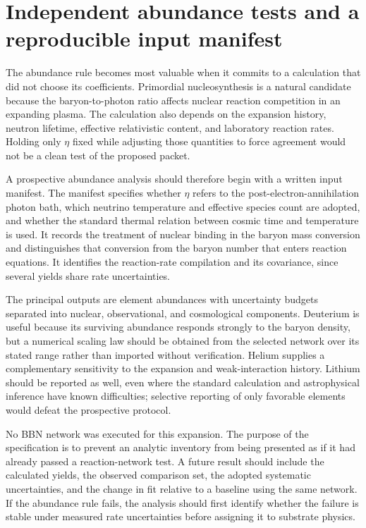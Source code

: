 \section{Independent abundance tests and a reproducible input manifest}
The abundance rule becomes most valuable when it commits to a calculation that did not choose its coefficients. Primordial nucleosynthesis is a natural candidate because the baryon-to-photon ratio affects nuclear reaction competition in an expanding plasma. The calculation also depends on the expansion history, neutron lifetime, effective relativistic content, and laboratory reaction rates. Holding only $\eta$ fixed while adjusting those quantities to force agreement would not be a clean test of the proposed packet.

A prospective abundance analysis should therefore begin with a written input manifest. The manifest specifies whether $\eta$ refers to the post-electron-annihilation photon bath, which neutrino temperature and effective species count are adopted, and whether the standard thermal relation between cosmic time and temperature is used. It records the treatment of nuclear binding in the baryon mass conversion and distinguishes that conversion from the baryon number that enters reaction equations. It identifies the reaction-rate compilation and its covariance, since several yields share rate uncertainties.

The principal outputs are element abundances with uncertainty budgets separated into nuclear, observational, and cosmological components. Deuterium is useful because its surviving abundance responds strongly to the baryon density, but a numerical scaling law should be obtained from the selected network over its stated range rather than imported without verification. Helium supplies a complementary sensitivity to the expansion and weak-interaction history. Lithium should be reported as well, even where the standard calculation and astrophysical inference have known difficulties; selective reporting of only favorable elements would defeat the prospective protocol.

No BBN network was executed for this expansion. The purpose of the specification is to prevent an analytic inventory from being presented as if it had already passed a reaction-network test. A future result should include the calculated yields, the observed comparison set, the adopted systematic uncertainties, and the change in fit relative to a baseline using the same network. If the abundance rule fails, the analysis should first identify whether the failure is stable under measured rate uncertainties before assigning it to substrate physics.

